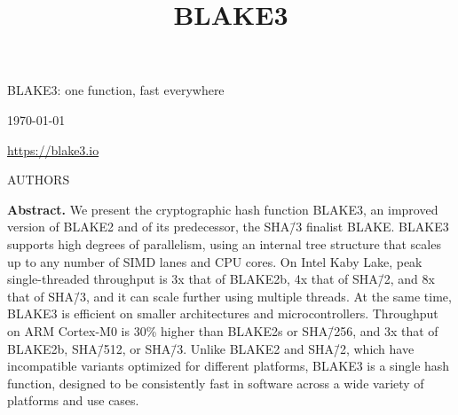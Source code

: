 \documentclass[11pt,notitlepage,a4paper]{article}
\title{BLAKE3}
\begin{document}
\selectfont

\pagestyle{plain}

\begin{center}
{\huge BLAKE3: one function, fast everywhere}

\bigskip

\mydate\today 

\medskip

\url{https://blake3.io}

\medskip

AUTHORS
\end{center}


\medskip

\begin{center}
  \begin{minipage}{0.92\linewidth}

      \textbf{Abstract.} We present the cryptographic hash function BLAKE3, an
      improved version of BLAKE2 and of its predecessor, the SHA\=/3 finalist
      BLAKE. BLAKE3 supports high degrees of parallelism, using an internal
      tree structure that scales up to any number of SIMD lanes and CPU cores.
      On Intel Kaby Lake, peak single-threaded throughput is 3x that of
      BLAKE2b, 4x that of SHA\=/2, and 8x that of SHA\=/3, and it can scale
      further using multiple threads. At the same time, BLAKE3 is efficient on
      smaller architectures and microcontrollers. Throughput on ARM Cortex-M0
      is 30\% higher than BLAKE2s or SHA\=/256, and 3x that of BLAKE2b,
      SHA\=/512, or SHA\=/3. Unlike BLAKE2 and SHA\=/2, which have incompatible
      variants optimized for different platforms, BLAKE3 is a single hash
      function, designed to be consistently fast in software across a wide
      variety of platforms and use cases.

   \end{minipage}
\end{center}
\end{document}
